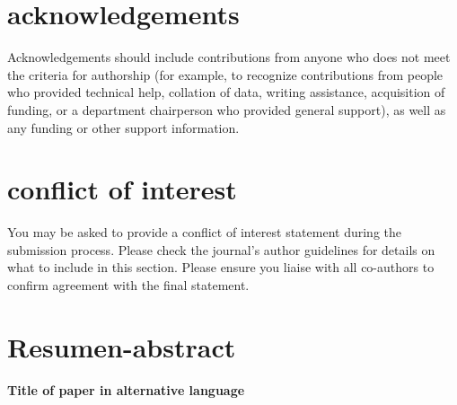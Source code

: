 \documentclass[alpha-refs,serif]{ecotropicos-article}
\begin{document}
\begin{multicols}{2}
\section*{acknowledgements}
Acknowledgements should include contributions from anyone who does not meet the criteria for authorship (for example, to recognize contributions from people who provided technical help, collation of data, writing assistance, acquisition of funding, or a department chairperson who provided general support), as well as any funding or other support information.

\section*{conflict of interest}
You may be asked to provide a conflict of interest statement during the submission process. Please check the journal's author guidelines for details on what to include in this section. Please ensure you liaise with all co-authors to confirm agreement with the final statement.

\section*{Resumen-abstract}

\textbf{\Large{Title of paper in alternative language}}

\end{multicols}

\begin{multicols*}{2}







\end{multicols*}


\end{document}
